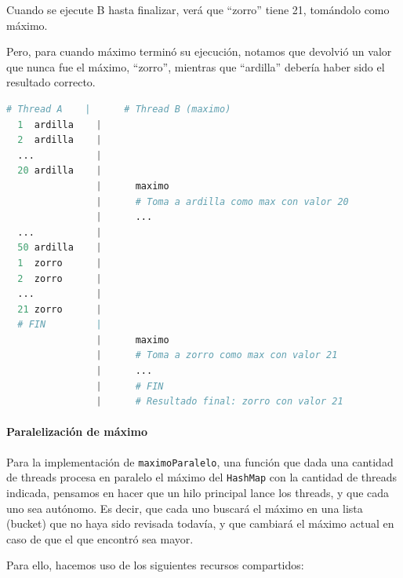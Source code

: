 \documentclass[a4paper]{article}
\begin{document}
Cuando se ejecute B hasta finalizar, verá que ``zorro'' tiene 21, tomándolo como máximo.

Pero, para cuando máximo terminó su ejecución, notamos que devolvió un valor que nunca fue el máximo, ``zorro'', mientras que ``ardilla'' debería haber sido el resultado correcto. \\

\begin{lstlisting}[language=python, caption=Secuencia de inserciones, mathescape=true]
  # Thread A    |      # Thread B (maximo)
  1  ardilla    |
  2  ardilla    |
  ...           |
  20 ardilla    |
                |      maximo
                |      # Toma a ardilla como max con valor 20
                |      ...
  ...           |
  50 ardilla    |
  1  zorro      |
  2  zorro      |
  ...           |
  21 zorro      |  
  # FIN         |  
                |      maximo
                |      # Toma a zorro como max con valor 21
                |      ...
                |      # FIN
                |      # Resultado final: zorro con valor 21
\end{lstlisting}

\paragraph{Paralelización de máximo}

Para la implementación de \texttt{maximoParalelo}, una función que dada una cantidad de threads procesa en paralelo el máximo del \texttt{HashMap} con la cantidad de threads indicada, pensamos en hacer que un hilo principal lance los threads, y que cada uno sea autónomo. Es decir, que cada uno buscará el máximo en una lista (bucket) que no haya sido revisada todavía, y que cambiará el máximo actual en caso de que el que encontró sea mayor.

Para ello, hacemos uso de los siguientes recursos compartidos:
\end{document}
